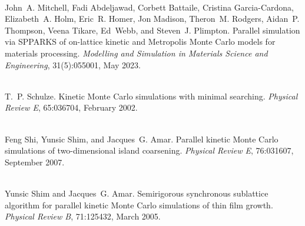 \begin{DoxyDescription}
\item[\label{citelist_CITEREF_plim23}%
\Hypertarget{citelist_CITEREF_plim23}%
\mbox{[}7\mbox{]}]\hfill \\
John~A. Mitchell, Fadi Abdeljawad, Corbett Battaile, Cristina Garcia-\/\+Cardona, Elizabeth~A. Holm, Eric~R. Homer, Jon Madison, Theron~M. Rodgers, Aidan~P. Thompson, Veena Tikare, Ed~Webb, and Steven~J. Plimpton. Parallel simulation via SPPARKS of on-\/lattice kinetic and Metropolis Monte Carlo models for materials processing. {\itshape Modelling and Simulation in Materials Science and Engineering}, 31(5)\+:055001, May 2023.


\item[\label{citelist_CITEREF_sch02}%
\Hypertarget{citelist_CITEREF_sch02}%
\mbox{[}8\mbox{]}]\hfill \\
T.~P. Schulze. Kinetic Monte Carlo simulations with minimal searching. {\itshape Physical Review E}, 65\+:036704, February 2002.


\item[\label{citelist_CITEREF_shi07}%
\Hypertarget{citelist_CITEREF_shi07}%
\mbox{[}9\mbox{]}]\hfill \\
Feng Shi, Yunsic Shim, and Jacques~G. Amar. Parallel kinetic Monte Carlo simulations of two-\/dimensional island coarsening. {\itshape Physical Review E}, 76\+:031607, September 2007.


\item[\label{citelist_CITEREF_shim05}%
\Hypertarget{citelist_CITEREF_shim05}%
\mbox{[}10\mbox{]}]\hfill \\
Yunsic Shim and Jacques~G. Amar. Semirigorous synchronous sublattice algorithm for parallel kinetic Monte Carlo simulations of thin film growth. {\itshape Physical Review B}, 71\+:125432, March 2005.


\end{DoxyDescription}